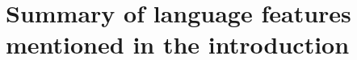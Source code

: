 \documentclass{article}
\begin{document}
\section{Summary of language features mentioned in the introduction}
\label{sec:summ-lang-feat}

\end{document}
